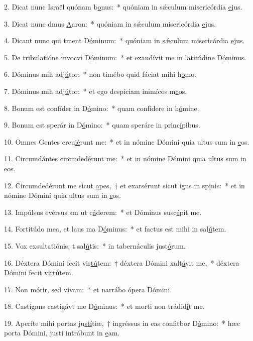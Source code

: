 2. Dicat nunc Israël quónam b\uline{o}nus:~* quóniam in sǽculum misericórdia \uline{e}jus.\par 
3. Dicat nunc dmus \uline{A}aron:~* quóniam in sǽculum misericórdia \uline{e}jus.\par 
4. Dicant nunc qui tment D\uline{ó}minum:~* quóniam in sǽculum misericórdia \uline{e}jus.\par 
5. De tribulatióne invocvi D\uline{ó}minum:~* et exaudívit me in latitúdine D\uline{ó}minus.\par 
6. Dóminus mih adj\uline{ú}tor:~* non timébo quid fáciat mihi h\uline{o}mo.\par 
7. Dóminus mih adj\uline{ú}tor:~* et ego despíciam inimícos m\uline{e}os.\par 
8. Bonum est confíder in D\uline{ó}mino:~* quam confídere in h\uline{ó}mine.\par 
9. Bonum est sperár in D\uline{ó}mino:~* quam speráre in princ\uline{í}pibus.\par 
10. Omnes Gentes crcu\uline{ié}runt me:~* et in nómine Dómini quia ultus sum in \uline{e}os.\par 
11. Circumdántes circmded\uline{é}runt me:~* et in nómine Dómini quia ultus sum in \uline{e}os.\par 
12. Circumdedérunt me sicut \uline{a}pes,~† et exarsérunt sicut igns in sp\uline{i}nis:~* et in nómine Dómini quia ultus sum in \uline{e}os.\par 
13. Impúlsus evérsus sm ut c\uline{á}derem:~* et Dóminus susc\uline{é}pit me.\par 
14. Fortitúdo mea, et laus ma D\uline{ó}minus:~* et factus est mihi in sal\uline{ú}tem.\par 
15. Vox exsultatiónis, t sal\uline{ú}tis:~* in tabernáculis just\uline{ó}rum.\par 
16. Déxtera Dómini fecit vir\uline{tú}tem:~† déxtera Dómini xalt\uline{á}vit me,~* déxtera Dómini fecit virt\uline{ú}tem.\par 
17. Non mórir, sed v\uline{i}vam:~* et narrábo ópera D\uline{ó}mini.\par 
18. Castígans castigávt me D\uline{ó}minus:~* et morti non trádid\uline{i}t me.\par 
19. Aperíte mihi portas ju\uline{stí}tiæ,~† ingréssus in eas confitbor D\uline{ó}mino:~* hæc porta Dómini, justi intrábunt in \uline{e}am.\par 
